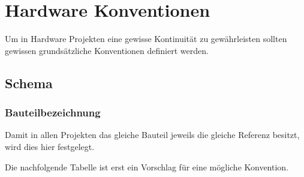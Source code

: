 



\section{Hardware Konventionen}
Um in Hardware Projekten eine gewisse Kontinuität zu gewährleisten sollten 
gewissen grundsätzliche Konventionen definiert werden. 

\subsection{Schema}

\subsubsection{Bauteilbezeichnung}
Damit in allen Projekten das gleiche Bauteil jeweils die gleiche Referenz 
besitzt, wird dies hier festgelegt. 

Die nachfolgende Tabelle ist erst ein Vorschlag für eine mögliche Konvention. 

